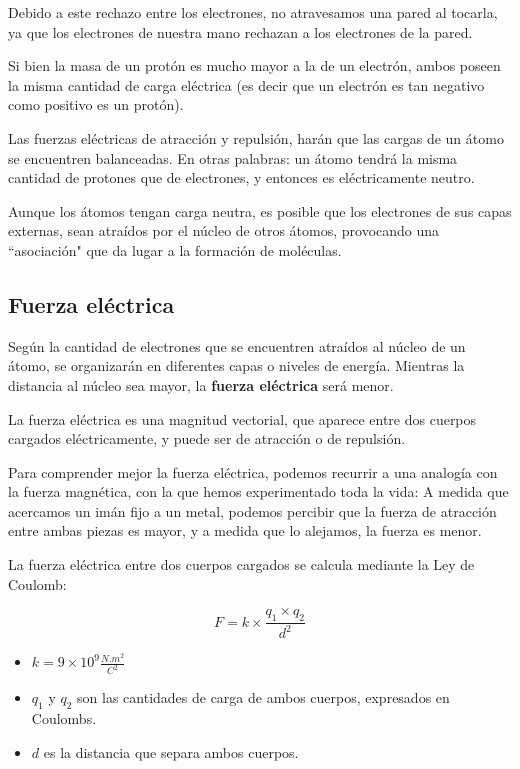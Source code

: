 Debido a este rechazo entre los electrones, no atravesamos una pared al tocarla, ya que los electrones de nuestra mano rechazan a los electrones de la pared.

Si bien la masa de un protón es mucho mayor a la de un electrón, ambos poseen la misma cantidad de carga eléctrica (es decir que un electrón es tan negativo como positivo es un protón). 

Las fuerzas eléctricas de atracción y repulsión, harán que las cargas de un átomo se encuentren balanceadas. En otras palabras: un átomo tendrá la misma cantidad de protones que de electrones, y entonces es eléctricamente neutro.

Aunque los átomos tengan carga neutra, es posible que los electrones de sus capas externas, sean atraídos por el núcleo de otros átomos, provocando una ``asociación" que da lugar a la formación de moléculas.

\subsection{Fuerza eléctrica}

Según la cantidad de electrones que se encuentren atraídos al núcleo de un átomo, se organizarán en diferentes capas o niveles de energía. Mientras la distancia al núcleo sea mayor, la \textbf{fuerza eléctrica} será menor.

La fuerza eléctrica es una magnitud vectorial, que aparece entre dos cuerpos cargados eléctricamente, y puede ser de atracción o de repulsión.

Para comprender mejor la fuerza eléctrica, podemos recurrir a una analogía con la fuerza magnética, con la que hemos experimentado toda la vida: 
A medida que acercamos un imán fijo a un metal, podemos percibir que la fuerza de atracción entre ambas piezas es mayor, y a medida que lo alejamos, la fuerza es menor.

La fuerza eléctrica entre dos cuerpos cargados se calcula mediante la Ley de Coulomb:

$$ F = k \times \frac{q_1 \times q_2}{d^{2}} $$

\begin{itemize}
	\item $k=9 \times 10^{9}\frac{N.m^{2}}{C^{2}}$
	\item $q_1$ y $q_2$ son las cantidades de carga de ambos cuerpos, expresados en Coulombs.
	\item $d$ es la distancia que separa ambos cuerpos.
\end{itemize}

